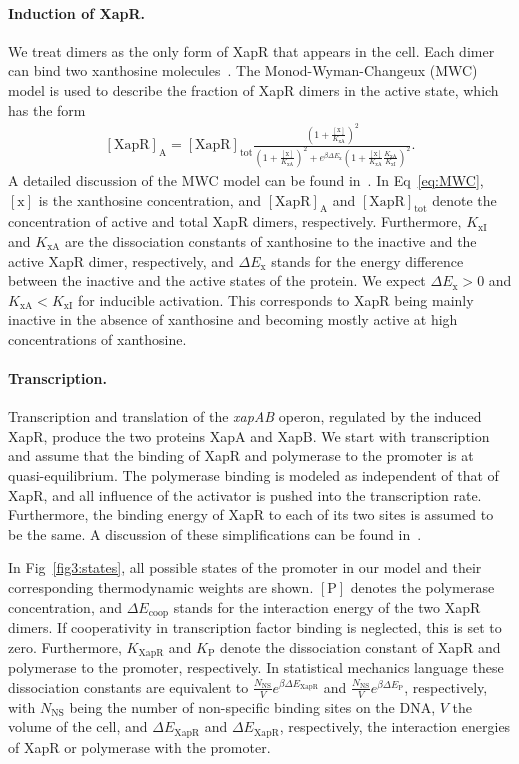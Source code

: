 \documentclass[10pt,letterpaper]{article}
\newcommand{\n}[1]{\mathrm{#1}}
\begin{document}
	\paragraph*{Induction of XapR.} 
	We treat dimers as the only form of XapR that appears in the cell. Each
	dimer can bind two xanthosine molecules~\cite{Joergensen1999}. The Monod-Wyman-Changeux (MWC)
	model is used to describe the fraction of XapR dimers in the active state,
	which has the form
	\begin{eqnarray}
	\label{eq:MWC}
	\n{[XapR]_A} = \n{[XapR]_{tot}} \frac{\left(1 + \frac{\n{[x]}}{K_{\n{xA}}}\right)^2}{\left(1 + \frac{\n{[x]}}{K_{\n{xA}}}\right)^2 + e^{\beta \Delta E_{\n{x}}} \left(1+\frac{\n{[x]}}{K_{\n{xA}}} \frac{K_{\n{xA}}}{K_{\n{xI}}}\right)^2}.
	\end{eqnarray}
	A detailed discussion of the
	MWC model can be found in~\cite{Marzen2013}. In Eq~\ref{eq:MWC},
	$\n{[x]}$ is the xanthosine concentration, and $\n{[XapR]_A}$ and
	$\n{[XapR]_{tot}}$ denote the concentration of active and total XapR dimers,
	respectively. Furthermore, $K_{\n{xI}}$ and $K_{\n{xA}}$ are the
	dissociation constants of xanthosine to the inactive and the active XapR
	dimer, respectively, and $\Delta E_{\n{x}}$ stands for the energy difference
	between the inactive and the active states of the protein. We expect $\Delta E_{\n{x}} > 0$
	and $K_{\n{xA}} < K_{\n{xI}}$ for inducible activation. This corresponds to
	XapR being mainly inactive in the absence of xanthosine and becoming mostly
	active at high concentrations of xanthosine. 
	
	\paragraph*{Transcription.}
	Transcription and translation of the \emph{xapAB} operon, regulated by the
	induced XapR, produce the two proteins XapA and XapB. We start with
	transcription and assume that the binding of XapR and polymerase to the
	promoter is at quasi-equilibrium. The polymerase binding is modeled as
	independent of that of XapR, and all influence of the activator is pushed
	into the transcription rate. Furthermore, the binding energy of XapR to each
	of its two sites is assumed to be the same. A discussion of these
	simplifications can be found in~.
	
	In Fig~\ref{fig3:states}, all possible states of the promoter in our model
	and their corresponding thermodynamic weights are shown. $\n{[P]}$
	denotes the polymerase concentration, and $\Delta E_{\n{coop}}$ stands for
	the interaction energy of the two XapR dimers. If cooperativity in
	transcription factor binding is neglected, this is set to zero. Furthermore,
	$K_{\n{XapR}}$ and $K_{\n{P}}$ denote the dissociation constant of XapR and
	polymerase to the promoter, respectively. In statistical mechanics language
	these dissociation constants are equivalent to
	$\frac{N_{\n{NS}}}{V} e^{\beta \Delta E_{\n{XapR}}}$
	and $\frac{N_{\n{NS}}}{V} e^{\beta \Delta E_{\n{P}}}$, respectively,
	with $N_{\mathrm{NS}}$ being the number of non-specific binding sites on the
	DNA, $V$ the volume of the cell, and $\Delta E_{\n{XapR}}$ and
	$\Delta E_{\n{XapR}}$, respectively, the interaction energies
	of XapR or polymerase with the promoter.
	
\end{document}
